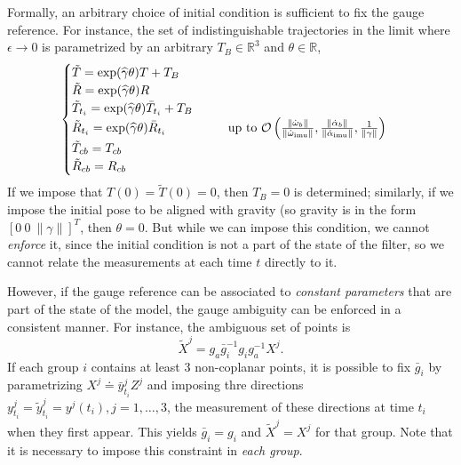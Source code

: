 \documentclass[]{article}
\def\real{\mathbb{R}}
\def\w{\omega}
\def\Xw{\tilde{X}}
\def\imu{_\mathrm{imu}}
\begin{document}
Formally, an arbitrary choice of initial condition is sufficient to fix the gauge reference. For instance, the set of indistinguishable trajectories in the limit where $\epsilon \rightarrow 0$ is parametrized by an arbitrary $T_B\in \real^3$ and $\theta \in \real$, 
\begin{equation}
\begin{cases}
\tilde T =  \exp(\widehat \gamma \theta) T + T_B   \\
\tilde R = \exp(\widehat \gamma \theta) R   \\ 
\tilde T_{t_i} = \exp(\widehat \gamma \theta) \bar T_{t_i} + T_B \\
\tilde R_{t_i} = \exp(\widehat \gamma \theta) \bar R_{t_i}  ~~~~~~~~~~~~~~~ {\rm up \ to \ } {\cal O}\left( \frac{\| \dot \w_b \|}{\|\dot \w\imu  \|}, \frac{\| \dot \alpha_b \|}{\|\dot \alpha\imu \|},  \frac{1}{\| \gamma \|} \right)  \\
\tilde T_{cb} = T_{cb}  \\
\tilde R_{cb} = R_{cb}   
\end{cases}
\label{eq-obs-zeroinput}
\end{equation}
If we impose that $T(0) = \tilde T(0) = 0$, then $T_B = 0$ is determined; similarly, if we impose the initial pose to be aligned with gravity (so gravity is in the form $[0 \ 0 \ \| \gamma \| ]^T$, then $\theta = 0$. But while we can impose this condition, we cannot {\em enforce} it, since the initial condition is not a part of the state of the filter, so we cannot relate the measurements at each time $t$ directly to it.

However, if the gauge reference can be associated to {\em constant parameters} that are part of the state of the model, the gauge ambiguity can be enforced in a consistent manner. For instance, the ambiguous set of points is
\begin{equation}
\Xw^j = g_a \bar g_i^{-1} g_i g_a^{-1} X^j.
\end{equation}
If each group $i$ contains at least $3$ non-coplanar points, it is possible to fix $\bar g_i$ by parametrizing $X^j \doteq \bar y^j_{t_i} Z^j$ and imposing thre directions $y^j_{t_i} = {\tilde y}^j_{t_i} = y^j(t_i), j = 1, \dots, 3$, the measurement of these directions at time $t_i$ when they first appear. This yields $\bar g_i = g_i$ and $\Xw^j = X^j$ for that group. Note that it is necessary to impose this constraint in {\em each group}.
\end{document}

